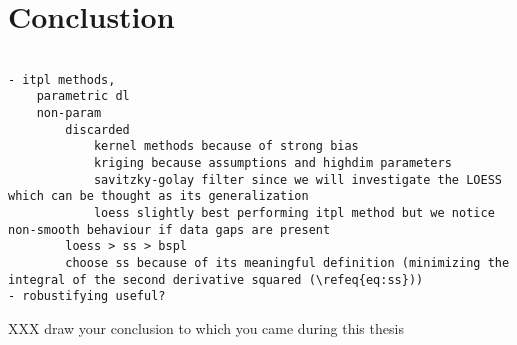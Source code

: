 \chapter{Conclustion}
\label{s:Conclusion}
\begin{verbatim}
    
- itpl methods, 
    parametric dl 
    non-param 
        discarded 
            kernel methods because of strong bias  
            kriging because assumptions and highdim parameters
            savitzky-golay filter since we will investigate the LOESS which can be thought as its generalization 
            loess slightly best performing itpl method but we notice non-smooth behaviour if data gaps are present
        loess > ss > bspl
        choose ss because of its meaningful definition (minimizing the integral of the second derivative squared (\refeq{eq:ss}))
- robustifying useful?

\end{verbatim}
XXX draw your conclusion to which you came during this thesis



